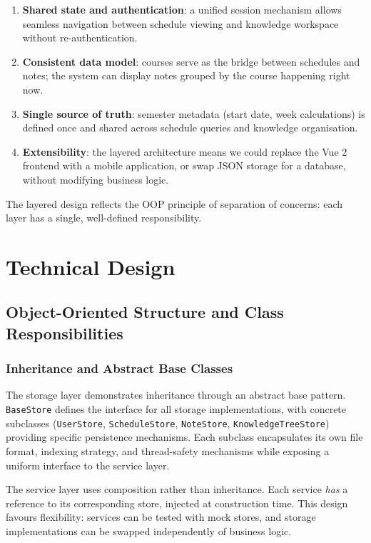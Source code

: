 \documentclass[11pt,a4paper]{article}
\begin{document}
\begin{enumerate}
    \item \textbf{Shared state and authentication}: a unified session mechanism allows seamless navigation between schedule viewing and knowledge workspace without re-authentication.
    \item \textbf{Consistent data model}: courses serve as the bridge between schedules and notes; the system can display notes grouped by the course happening right now.
    \item \textbf{Single source of truth}: semester metadata (start date, week calculations) is defined once and shared across schedule queries and knowledge organisation.
    \item \textbf{Extensibility}: the layered architecture means we could replace the Vue 2 frontend with a mobile application, or swap JSON storage for a database, without modifying business logic.
\end{enumerate}

The layered design reflects the OOP principle of separation of concerns: each layer has a single, well-defined responsibility.

\section{Technical Design}

\subsection{Object-Oriented Structure and Class Responsibilities}

\subsubsection{Inheritance and Abstract Base Classes}
The storage layer demonstrates inheritance through an abstract base pattern. \texttt{BaseStore} defines the interface for all storage implementations, with concrete subclasses (\texttt{UserStore}, \texttt{ScheduleStore}, \texttt{NoteStore}, \texttt{KnowledgeTreeStore}) providing specific persistence mechanisms. Each subclass encapsulates its own file format, indexing strategy, and thread-safety mechanisms while exposing a uniform interface to the service layer.

The service layer uses composition rather than inheritance. Each service \textit{has} a reference to its corresponding store, injected at construction time. This design favours flexibility: services can be tested with mock stores, and storage implementations can be swapped independently of business logic.
\end{document}
